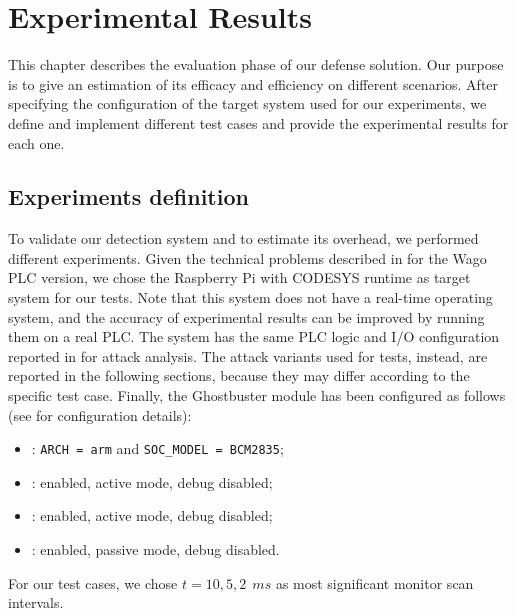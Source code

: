 \chapter{Experimental Results}
\label{chap:results}

This chapter describes the evaluation phase of our defense solution.
Our purpose is to give an estimation of its efficacy and efficiency on different scenarios.
After specifying the configuration of the target system used for our experiments, we define and implement different test cases
and provide the experimental results for each one.


\section{Experiments definition}
\label{sec:exp-def}

To validate our detection system and to estimate its overhead, we performed different experiments.
Given the technical problems described in  for the Wago PLC version, we chose the Raspberry Pi with CODESYS runtime as target system for our tests.
Note that this system does not have a real-time operating system, and the accuracy of experimental results can be improved by running them on a real PLC.
The system has the same PLC logic and I/O configuration reported in  for attack analysis.
The attack variants used for tests, instead, are reported in the following sections, because they may differ according to the specific test case.
Finally, the Ghostbuster module has been configured as follows (see  for configuration details):
\begin{itemize}
	\item {}: \verb|ARCH = arm| and \verb|SOC_MODEL = BCM2835|;
	\item {}: enabled, active mode, debug disabled;
	\item {}: enabled, active mode, debug disabled;
	\item {}: enabled, passive mode, debug disabled.
\end{itemize}
For our test cases, we chose $t=10,5,2~\SI{}{ms}$ as most significant monitor scan intervals.

